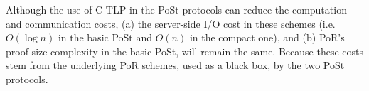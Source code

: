 \begin{remark}
Although the use of C-TLP in the PoSt protocols can reduce the computation and communication costs, (a) the server-side I/O cost in these schemes (i.e. $O(\log n)$ in the basic PoSt and $O(n)$ in the compact one), and (b) PoR's proof size complexity in the basic PoSt, will remain the same. Because these costs stem from the underlying PoR schemes, used as a black box, by the two PoSt protocols.
\end{remark}